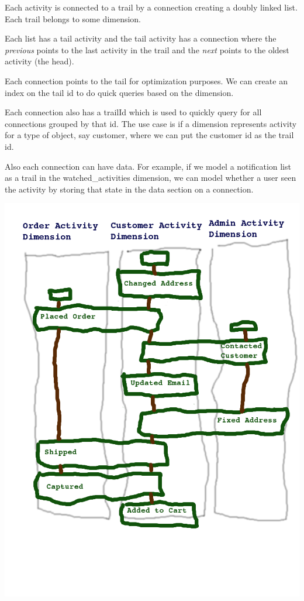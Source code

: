 \documentclass[11pt]{article}
\begin{document}
Each activity is connected to a trail by a connection creating a doubly linked list. Each
trail belongs to some dimension. 

Each list has a tail activity and the tail activity has a connection where
the \emph{previous} points to the last activity in the trail and the \emph{next} points to the oldest activity (the head).

Each connection points to the tail for optimization purposes. We can create an
index on the tail id to do quick queries based on the dimension.

Each connection also has a trailId which is used to quickly query for all connections grouped
by that id. The use case is if a dimension represents activity for a type of object, say customer,
where we can put the customer id as the trail id. 

Also each connection can have data. For example, if we model a notification list as a trail in the
watched\_activities dimension, we can model whether a user seen the activity by storing
that state in the data section on a connection.

\includegraphics[scale=0.40]{dimension}
\end{document}
